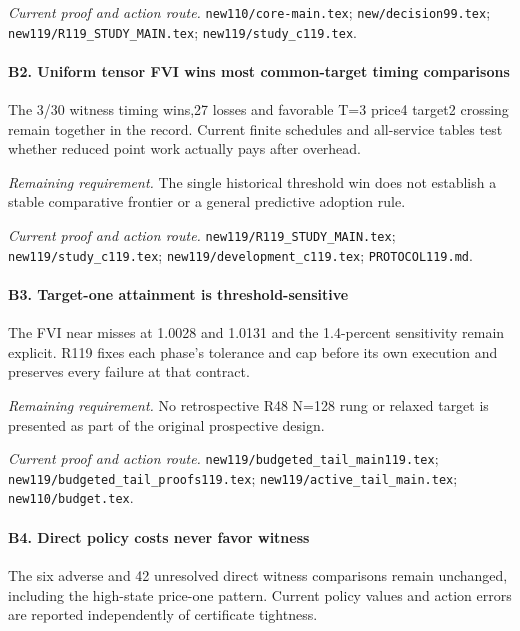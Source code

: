 \par\emph{Current proof and action route.} \nolinkurl{new110/core-main.tex}; \nolinkurl{new/decision99.tex}; \nolinkurl{new119/R119_STUDY_MAIN.tex}; \nolinkurl{new119/study_c119.tex}.

\paragraph{B2. Uniform tensor FVI wins most common-target timing comparisons}

The 3/30 witness timing wins,27 losses and favorable T=3 price4 target2 crossing remain together in the record. Current finite schedules and all-service tables test whether reduced point work actually pays after overhead.

\par\emph{Remaining requirement.} The single historical threshold win does not establish a stable comparative frontier or a general predictive adoption rule.

\par\emph{Current proof and action route.} \nolinkurl{new119/R119_STUDY_MAIN.tex}; \nolinkurl{new119/study_c119.tex}; \nolinkurl{new119/development_c119.tex}; \nolinkurl{PROTOCOL119.md}.

\paragraph{B3. Target-one attainment is threshold-sensitive}

The FVI near misses at 1.0028 and 1.0131 and the 1.4-percent sensitivity remain explicit. R119 fixes each phase's tolerance and cap before its own execution and preserves every failure at that contract.

\par\emph{Remaining requirement.} No retrospective R48 N=128 rung or relaxed target is presented as part of the original prospective design.

\par\emph{Current proof and action route.} \nolinkurl{new119/budgeted_tail_main119.tex}; \nolinkurl{new119/budgeted_tail_proofs119.tex}; \nolinkurl{new119/active_tail_main.tex}; \nolinkurl{new110/budget.tex}.

\paragraph{B4. Direct policy costs never favor witness}

The six adverse and 42 unresolved direct witness comparisons remain unchanged, including the high-state price-one pattern. Current policy values and action errors are reported independently of certificate tightness.

